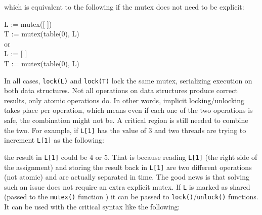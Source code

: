 \noindent
which is equivalent to the following if the mutex does not need to be explicit:

\begin{iconcode}
\>L := mutex([ ])\\
\>T := mutex(table(0), L)\\
{\textnormal {or}}\\
\>L := [ ]\\
\>T := mutex(table(0), L)\\
\end{iconcode}

In all cases, \texttt{lock(L)} and \texttt{lock(T)} lock the same mutex,
serializing execution on both data structures.  Not all operations on data
structures produce correct results, only atomic operations do. In other
words, implicit locking/unlocking takes place per operation, which means
even if each one of the two operations is safe, the combination might not
be. A critical region is still needed to combine the two.  For example, if
\texttt{L[1]} has the value of 3 and two threads are trying to increment
\texttt{L[1]} as the following:


\noindent
the result in \texttt{L[1]} could be 4 or 5. That is because reading
\texttt{L[1]} (the right side of the assignment) and storing the result
back in \texttt{L[1]} are two different operations (not atomic) and are
actually separated in time. The good news is that solving such an issue
does not require an extra explicit mutex.  If \texttt{L} is marked as
shared (passed to the \texttt{mutex()} function ) it can be passed to
\texttt{lock()}/\texttt{unlock()} functions.  It can be used with the
critical syntax like the following:


